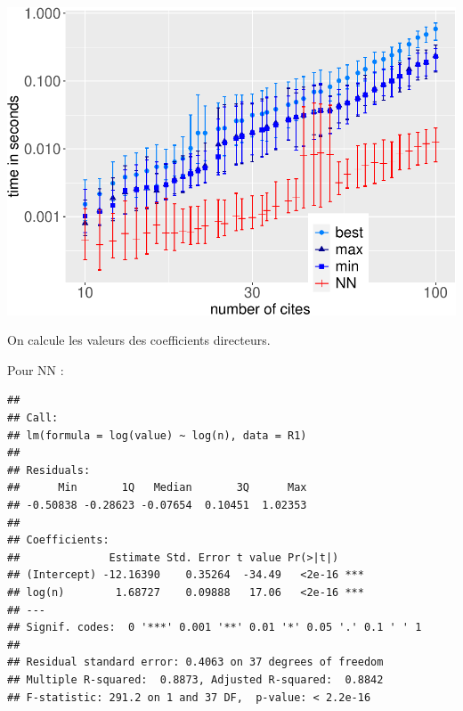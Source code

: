\documentclass[
]{article}
\newenvironment{Shaded}{\begin{snugshade}}{\end{snugshade}}
\newcommand{\AttributeTok}[1]{\textcolor[rgb]{0.77,0.63,0.00}{#1}}
\newcommand{\DecValTok}[1]{\textcolor[rgb]{0.00,0.00,0.81}{#1}}
\newcommand{\FunctionTok}[1]{\textcolor[rgb]{0.00,0.00,0.00}{#1}}
\newcommand{\NormalTok}[1]{#1}
\newcommand{\OtherTok}[1]{\textcolor[rgb]{0.56,0.35,0.01}{#1}}
\newcommand{\SpecialCharTok}[1]{\textcolor[rgb]{0.00,0.00,0.00}{#1}}
\newcommand{\StringTok}[1]{\textcolor[rgb]{0.31,0.60,0.02}{#1}}
\begin{document}
\includegraphics{rapport_TSP_files/figure-latex/unnamed-chunk-23-1.pdf}

On calcule les valeurs des coefficients directeurs.

Pour NN :

\begin{Shaded}
\end{Shaded}

\begin{verbatim}
## 
## Call:
## lm(formula = log(value) ~ log(n), data = R1)
## 
## Residuals:
##      Min       1Q   Median       3Q      Max 
## -0.50838 -0.28623 -0.07654  0.10451  1.02353 
## 
## Coefficients:
##              Estimate Std. Error t value Pr(>|t|)    
## (Intercept) -12.16390    0.35264  -34.49   <2e-16 ***
## log(n)        1.68727    0.09888   17.06   <2e-16 ***
## ---
## Signif. codes:  0 '***' 0.001 '**' 0.01 '*' 0.05 '.' 0.1 ' ' 1
## 
## Residual standard error: 0.4063 on 37 degrees of freedom
## Multiple R-squared:  0.8873, Adjusted R-squared:  0.8842 
## F-statistic: 291.2 on 1 and 37 DF,  p-value: < 2.2e-16
\end{verbatim}
\end{document}
